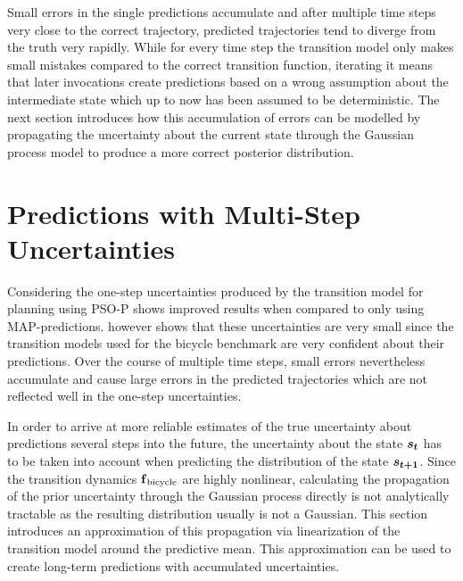 Small errors in the single predictions accumulate and after multiple time steps very close to the correct trajectory, predicted trajectories tend to diverge from the truth very rapidly.
While for every time step the transition model only makes small mistakes compared to the correct transition function, iterating it means that later invocations create predictions based on a wrong assumption about the intermediate state which up to now has been assumed to be deterministic.
The next section introduces how this accumulation of errors can be modelled by propagating the uncertainty about the current state through the Gaussian process model to produce a more correct posterior distribution.

\section{Predictions with Multi-Step Uncertainties}
Considering the one-step uncertainties produced by the transition model for planning using PSO-P shows improved results when compared to only using MAP-predictions.
 however shows that these uncertainties are very small since the transition models used for the bicycle benchmark are very confident about their predictions.
Over the course of multiple time steps, small errors nevertheless accumulate and cause large errors in the predicted trajectories which are not reflected well in the one-step uncertainties.

In order to arrive at more reliable estimates of the true uncertainty about predictions several steps into the future, the uncertainty about the state $\bm{s_t}$ has to be taken into account when predicting the distribution of the state $\bm{s_{t+1}}$.
Since the transition dynamics $\operatorname{\operatorname{\mathbf{f}}_{\text{bicycle}}}$ are highly nonlinear, calculating the propagation of the prior uncertainty through the Gaussian process directly is not analytically tractable as the resulting distribution usually is not a Gaussian.
This section introduces an approximation of this propagation via linearization of the transition model around the predictive mean.
This approximation can be used to create long-term predictions with accumulated uncertainties.


